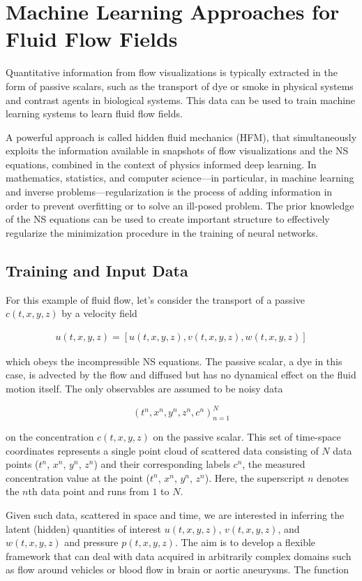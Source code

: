 \documentclass[book.tex]{subfiles}
\begin{document}
\section{Machine Learning Approaches for Fluid Flow Fields}

Quantitative information from flow visualizations is typically extracted in the form of passive scalars, such as the transport of dye or smoke in physical systems and contrast agents in biological systems. This data can be used to train machine learning systems to learn fluid flow fields.

A powerful approach is called hidden fluid mechanics (HFM), that simultaneously exploits the information available in snapshots of flow visualizations and the NS equations, combined in the context of physics informed deep learning. In mathematics, statistics, and computer science—in particular, in machine learning and inverse problems—regularization is the process of adding information in order to prevent overfitting or to solve an ill-posed problem. The prior knowledge of the NS equations can be used to create important structure to effectively regularize the minimization procedure in the training of neural networks.


\subsection{Training and Input Data}
For this example of fluid flow, let's consider the transport of a passive $c(t,x,y,z)$ by a velocity field

\begin{align}
u(t,x,y,z)=[u(t,x,y,z), v(t,x,y,z), w(t,x,y,z)]
\end{align}

\noindent which obeys the incompressible NS equations. The passive scalar, a dye in this case, is advected by the flow and diffused but has no dynamical effect on the fluid motion itself. The only observables are assumed to be noisy data 

\[(t^n,x^n,y^n,z^n,c^n)_{n=1}^{N}\] 

on the concentration $c(t,x,y,z)$ on the passive scalar. This set of time-space coordinates represents a single point cloud of scattered data consisting of $N$ data points ($t^n$, $x^n$, $y^n$, $z^n$) and their corresponding labels $c^n$, the measured concentration value at the point ($t^n$, $x^n$, $y^n$, $z^n$). Here, the superscript $n$ denotes the $n$th data point and runs from $1$ to $N$. 

Given such data, scattered in space and time, we are interested in inferring the latent (hidden) quantities of interest $u(t, x, y, z)$, $v(t, x, y, z)$, and $w(t, x, y, z)$ and pressure $p(t, x, y, z)$. The aim is to develop a flexible framework that can deal with data acquired in arbitrarily complex domains such as flow around vehicles or blood flow in brain or aortic aneurysms. The function 
\end{document}
